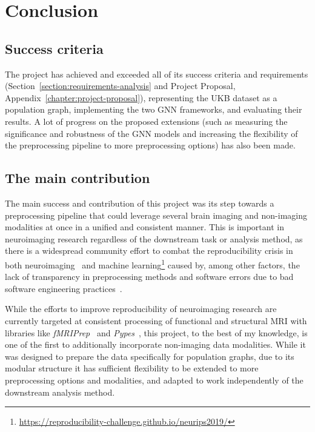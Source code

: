 \chapter{Conclusion}



\section{Success criteria}
The project has achieved and exceeded all of its success criteria and requirements (Section~\ref{section:requirements-analysis} and Project Proposal, Appendix~\ref{chapter:project-proposal}), representing the UKB dataset as a population graph, implementing the two GNN frameworks, and evaluating their results. A lot of progress on the proposed extensions (such as measuring the significance and robustness of the GNN models and increasing the flexibility of the preprocessing pipeline to more preprocessing options) has also been made.

\section{The main contribution}
The main success and contribution of this project was its step towards a preprocessing pipeline that could leverage several brain imaging and non-imaging modalities at once in a unified and consistent manner. This is important in neuroimaging research regardless of the downstream task or analysis method, as there is a widespread community effort to combat the reproducibility crisis in both neuroimaging~\cite{gorgolewski2016practical} and machine learning\footnote{\url{https://reproducibility-challenge.github.io/neurips2019/}} caused by, among other factors, the lack of transparency in preprocessing methods and software errors due to bad software engineering practices~\cite{poldrack2017scanning}.

While the efforts to improve reproducibility of neuroimaging research are currently targeted at consistent processing of functional and structural MRI with libraries like \textit{fMRIPrep}~\cite{esteban2019fmriprep} and \textit{Pypes}~\cite{savio2017pypes}, this project, to the best of my knowledge, is one of the first to additionally incorporate non-imaging data modalities. While it was designed to prepare the data specifically for population graphs, due to its modular structure it has sufficient flexibility to be extended to more preprocessing options and modalities, and adapted to work independently of the downstream analysis method.

